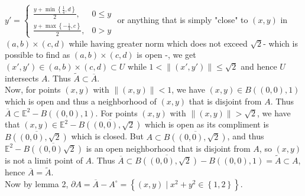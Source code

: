 \documentclass[a4paper]{article}
\begin{document}
    $y' = \begin{cases}
        \frac{y + \min\left\{ \frac{1}{4},d \right\} }{2}, & 0 \le y\\
        \frac{y + \max\left\{ -\frac{1}{4},c \right\} }{2}, & 0> y
    \end{cases}$ or anything that is simply "close" to $(x,y)$ in $(a,b) \times
    (c,d)$ while having greater norm which does not exceed $\sqrt{2} $- which is possible to find as $(a,b)
    \times (c,d)$ is open -,
    we get $(x',y') \in (a,b) \times (c,d) \subset U$ while $1 < \|(x',y')\|
    \le \sqrt{2} $ and hence $U$ intersects $A$. Thus
    $\tilde{A} \subset \overline{A}$.\\
    \linebreak
    Now, for points $(x,y)$ with $\|(x,y)\| < 1$, we have
    $(x,y) \in B\left( (0,0), 1 \right) $ which is open
    and thus a neighborhood of $(x,y)$ that is disjoint from $A$. Thus
    $\overline{A} \subset \mathbb{E}^2 -  B\left( (0,0), 1 \right)$. 
    For points $(x,y)$ with $\|(x,y)\| > \sqrt{2} $, we have that
    $(x,y) \in \mathbb{E}^2 - \overline{B\left( (0,0), \sqrt{2}  \right) }$ 
    which is open as its compliment is $\overline{B \left( (0,0), \sqrt{2}
    \right) }$ which is closed. But $A \subset \overline{B \left( (0,0),
    \sqrt{2}  \right) }$, and thus $\mathbb{E}^2 - \overline{B \left(
(0,0)\sqrt{2}  \right) }$ is an open neighborhood that is disjoint from $A$, so
$(x,y)$ is not a limit point of $A$. Thus
$\overline{A} \subset \overline{B \left( (0,0), \sqrt{2}  \right) } -
B \left( (0,0),1 \right) = \tilde{A} \subset A$, hence $\overline{A}
= \tilde{A}$.\\
\linebreak
Now by lemma 2, $\partial A = \overline{A} - A^{\circ}
= \left\{ (x,y)  \mid x^2 + y^2 \in \left\{ 1,2 \right\}  \right\} $.\\
\linebreak
\end{document}
